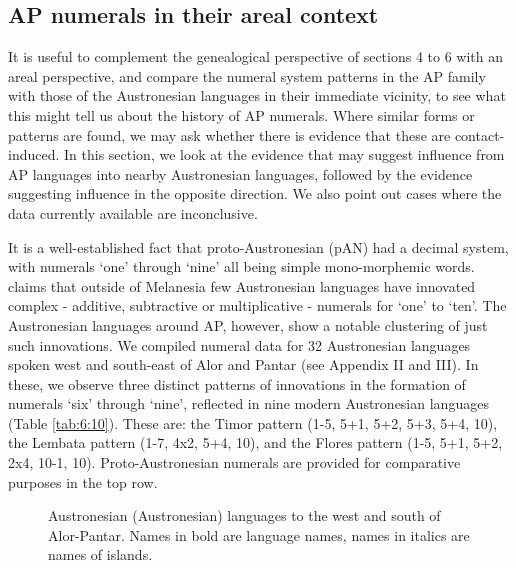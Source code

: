 \documentclass[output=paper]{LSP/langsci}
\begin{document}
\subsection{AP numerals in their areal context}\label{sec:6:7.2}
It is useful to complement the genealogical perspective of sections 4 to 6 with an areal perspective, and compare the numeral system patterns in the AP family with those of the Austronesian languages in their immediate vicinity, to see what this might tell us about the history of AP numerals. Where similar forms or patterns are found, we may ask whether there is evidence that these are contact-induced. In this section, we look at the evidence that may suggest influence from AP languages into nearby Austronesian languages, followed by the evidence suggesting influence in the opposite direction. We also point out cases where the data currently available are inconclusive. 

It is a well-established fact that proto-Austronesian (pAN) had a decimal system, with numerals `one' through `nine' all being simple mono-morphemic words. \citet[268]{Blust2009} claims that outside of Melanesia few Austronesian languages have innovated complex - additive, subtractive or multiplicative - numerals for `one' to `ten'. The Austronesian languages around AP, however, show a notable clustering of just such innovations. We compiled numeral data for 32 Austronesian languages spoken west and south-east of Alor and Pantar (see Appendix II and III). In these, we observe three distinct patterns of innovations in the formation of numerals `six' through `nine', reflected in nine modern Austronesian languages (Table \ref{tab:6:10}). These are: the Timor pattern (1-5, 5+1, 5+2, 5+3, 5+4, 10), the Lembata pattern (1-7, 4x2, 5+4, 10), and the Flores pattern (1-5, 5+1, 5+2, 2x4, 10-1, 10). Proto-Austronesian numerals are provided for comparative purposes in the top row. 

\begin{figure}
\caption{Austronesian (Austronesian) languages to the west and south of Alor{}-Pantar. Names in bold are language names, names in italics are names of islands.}
\label{fig:6:1}
\end{figure}
 
\end{document}
